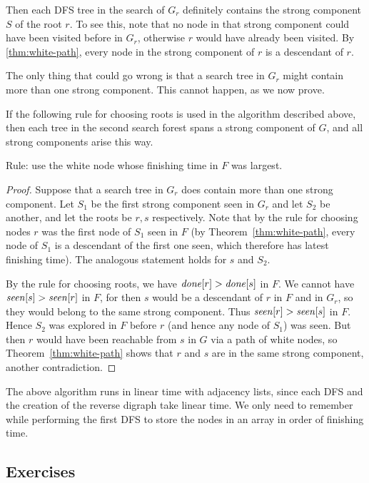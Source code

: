 Then each DFS tree in the search of $G_r$ definitely contains the strong
component $S$ of the root $r$. To see this, note that no node in that
strong component could have been visited before in $G_r$, otherwise $r$
would have already been visited. By \cref{thm:white-path}, every
node in the strong component of $r$ is a descendant of $r$.

The only thing that could go wrong is that a search tree in $G_r$
might contain more than one strong component. This cannot happen,
as we now prove.

\begin{Theorem} \label{thm:scc-alg} 
If the following rule for choosing roots is used in the algorithm
described above, then each tree in the second search forest spans a
strong component of $G$, and all strong components arise this way.

Rule: use the white node whose finishing time in $F$ was largest.
\end{Theorem}

\begin{proof}
Suppose that a search tree in $G_r$ does  contain more than one strong
component. Let $S_1$ be the first strong component seen in $G_r$ and let
$S_2$ be another, and let the roots be $r, s$ respectively. Note that by
the rule for choosing nodes $r$ was the first node of $S_1$ seen in $F$
(by Theorem~\ref{thm:white-path}, every node of $S_1$ is a descendant
of the first one seen, which therefore has latest finishing time). The
analogous statement holds for $s$ and $S_2$.

By the rule for choosing roots, we have $\operatorname{\text{\textit{done}}}[r] > \operatorname{\text{\textit{done}}}[s]$ in $F$. We
cannot have $\operatorname{\text{\textit{seen}}}[s] > \operatorname{\text{\textit{seen}}}[r]$ in $F$, for then $s$ would be a descendant
of $r$ in $F$ and in $G_r$, so they would belong to the same strong
component. Thus $\operatorname{\text{\textit{seen}}}[r] > \operatorname{\text{\textit{seen}}}[s]$ in $F$. Hence $S_2$ was explored
in $F$ before $r$ (and hence any node of $S_1$) was seen. But then $r$
would have been reachable from $s$ in $G$ via a path of white nodes,
so Theorem~\ref{thm:white-path} shows that $r$ and $s$ are in the same
strong component, another contradiction.
\end{proof} 

The above algorithm runs in linear time with adjacency lists, since each
DFS and the creation of the reverse digraph take linear time. We only
need to remember  while performing the first DFS to store the nodes in
an array in order of finishing time. 

\subsection*{Exercises}

